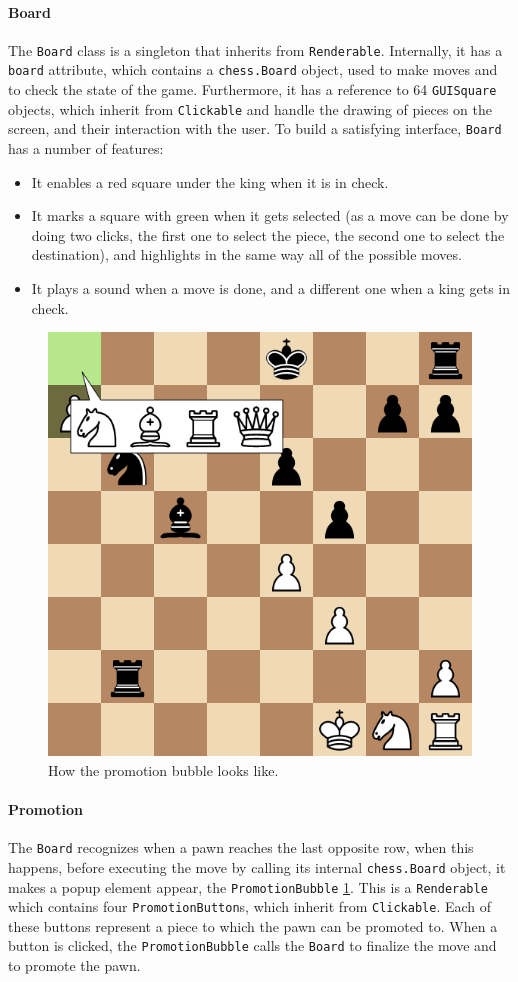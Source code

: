 \documentclass[a4paper, 11pt, twocolumn]{IEEEtran}
\begin{document}
    \paragraph*{Board} The \texttt{Board} class is a singleton that inherits from \texttt{Renderable}. Internally, it has a \texttt{board} attribute, which contains a \texttt{chess.Board} object, used to make moves and to check the state of the game. Furthermore, it has a reference to 64 \texttt{GUISquare} objects, which inherit from \texttt{Clickable} and handle the drawing of pieces on the screen, and their interaction with the user. To build a satisfying interface, \texttt{Board} has a number of features:
    \begin{itemize}
        \item It enables a red square under the king when it is in check.
        \item It marks a square with green when it gets selected (as a move can be done by doing two clicks, the first one to select the piece, the second one to select the destination), and highlights in the same way all of the possible moves.
        \item It plays a sound when a move is done, and a different one when a king gets in check.
    \end{itemize}
    \begin{figure}
        \centering
        \includegraphics[width=.45\textwidth]{images/promotion_bubble.png}
        \caption{How the promotion bubble looks like.}
        \label{fig:promotion}
    \end{figure}
    \paragraph*{Promotion} The \texttt{Board} recognizes when a pawn reaches the last opposite row, when this happens, before executing the move by calling its internal \texttt{chess.Board} object, it makes a popup element appear, the \texttt{PromotionBubble} \ref{fig:promotion}. This is a \texttt{Renderable} which contains four \texttt{PromotionButton}s, which inherit from \texttt{Clickable}. Each of these buttons represent a piece to which the pawn can be promoted to. When a button is clicked, the \texttt{PromotionBubble} calls the \texttt{Board} to finalize the move and to promote the pawn.
\end{document}
